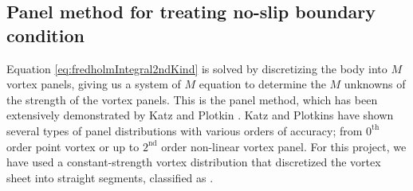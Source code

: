 \subsection{Panel method for treating no-slip boundary condition}
Equation \ref{eq:fredholmIntegral2ndKind} is solved by discretizing the body into $M$ vortex panels, giving us a system of $M$ equation to determine the $M$ unknowns of the strength of the vortex panels. This is the panel method, which has been extensively demonstrated by Katz and Plotkin \cite{Katz2001a}. Katz and Plotkins have shown several types of panel distributions with various orders of accuracy; from $0^{\mathrm{th}}$ order point vortex or up to $2^{\mathrm{nd}}$ order non-linear vortex panel. For this project, we have used a constant-strength vortex distribution that discretized the vortex sheet into straight segments, classified as .

